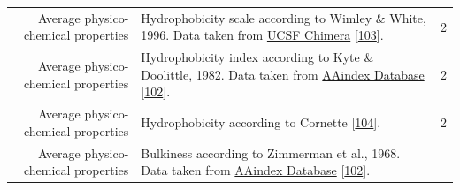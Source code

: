 \documentclass[12pt,a4paper,twoside]{book}
\theoremstyle{definition}
\theoremstyle{definition}
\theoremstyle{remark}
\begin{document}
\begin{longtable}[]{@{}rlc@{}}
\begin{minipage}[t]{0.23\columnwidth}\raggedleft\strut
Average physico-chemical properties\strut
\end{minipage} & \begin{minipage}[t]{0.50\columnwidth}\raggedright\strut
Hydrophobicity scale according to Wimley \& White, 1996. Data taken from
\href{https://www.cgl.ucsf.edu/chimera/docs/ContributedSoftware/defineattrib/wwHydrophobicity.txt}{UCSF
Chimera} {[}\protect\hyperlink{ref-Wimley1996}{103}{]}.\strut
\end{minipage} & \begin{minipage}[t]{0.18\columnwidth}\centering\strut
2\strut
\end{minipage}\tabularnewline
\begin{minipage}[t]{0.23\columnwidth}\raggedleft\strut
Average physico-chemical properties\strut
\end{minipage} & \begin{minipage}[t]{0.50\columnwidth}\raggedright\strut
Hydrophobicity index according to Kyte \& Doolittle, 1982. Data taken
from
\href{http://www.genome.jp/dbget-bin/www_bget?aaindex:KYTJ820101}{AAindex
Database} {[}\protect\hyperlink{ref-Kawashima2008}{102}{]}.\strut
\end{minipage} & \begin{minipage}[t]{0.18\columnwidth}\centering\strut
2\strut
\end{minipage}\tabularnewline
\begin{minipage}[t]{0.23\columnwidth}\raggedleft\strut
Average physico-chemical properties\strut
\end{minipage} & \begin{minipage}[t]{0.50\columnwidth}\raggedright\strut
Hydrophobicity according to Cornette
{[}\protect\hyperlink{ref-Cornette1987}{104}{]}.\strut
\end{minipage} & \begin{minipage}[t]{0.18\columnwidth}\centering\strut
2\strut
\end{minipage}\tabularnewline
\begin{minipage}[t]{0.23\columnwidth}\raggedleft\strut
Average physico-chemical properties\strut
\end{minipage} & \begin{minipage}[t]{0.50\columnwidth}\raggedright\strut
Bulkiness according to Zimmerman et al., 1968. Data taken from
\href{http://www.genome.jp/dbget-bin/www_bget?aaindex:ZIMJ680102}{AAindex
Database} {[}\protect\hyperlink{ref-Kawashima2008}{102}{]}.\strut
\end{minipage} & \begin{minipage}[t]{0.18\columnwidth}\centering\strut

\end{minipage}
\end{longtable}
\end{document}
